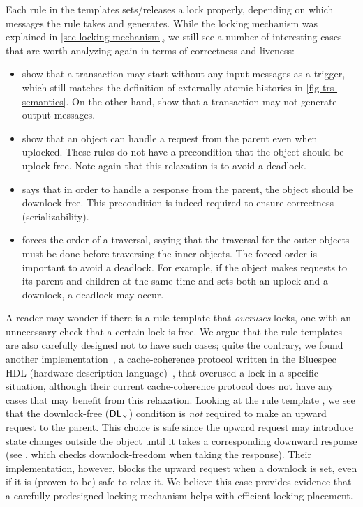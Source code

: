 \documentclass[sigplan,10pt,review,anonymous,screen]{acmart}\settopmatter{printfolios=true,printccs=false,printacmref=false}
\begin{document}
Each rule in the templates sets/releases a lock properly, depending on which messages the rule takes and generates.
While the locking mechanism was explained in \autoref{sec-locking-mechanism}, we still see a number of interesting cases that are worth analyzing again in terms of correctness and liveness:
\begin{itemize}
\item {} show that a transaction may start without any input messages as a trigger, which still matches the definition of externally atomic histories in \autoref{fig-trs-semantics}. On the other hand,  show that a transaction may not generate output messages.
\item {} show that an object can handle a request from the parent even when uplocked. These rules do not have a precondition that the object should be uplock-free. Note again that this relaxation is to avoid a deadlock.
\item {} says that in order to handle a response from the parent, the object should be downlock-free. This precondition is indeed required to ensure correctness (serializability).
\item {} forces the order of a traversal, saying that the traversal for the outer objects must be done before traversing the inner objects. The forced order is important to avoid a deadlock. For example, if the object makes requests to its parent and children at the same time and sets both an uplock and a downlock, a deadlock may occur.
\end{itemize}

A reader may wonder if there is a rule template that \emph{overuses} locks, \ie{} one with an unnecessary check that a certain lock is free.
We argue that the rule templates are also carefully designed not to have such cases; quite the contrary, we found another implementation~\cite{Zhang:2019,thesis:Zhang:2019}, a cache-coherence protocol written in the Bluespec HDL (hardware description language)~\cite{bluespec}, that overused a lock in a specific situation, although their current cache-coherence protocol does not have any cases that may benefit from this relaxation.
Looking at the rule template , we see that the downlock-free ($\textsf{DL}_{\times}$) condition is \emph{not} required to make an upward request to the parent.
This choice is safe since the upward request may introduce state changes outside the object until it takes a corresponding downward response (see , which checks downlock-freedom when taking the response).
Their implementation, however, blocks the upward request when a downlock is set, even if it is (proven to be) safe to relax it.
We believe this case provides evidence that a carefully predesigned locking mechanism helps with efficient locking placement.
\end{document}
